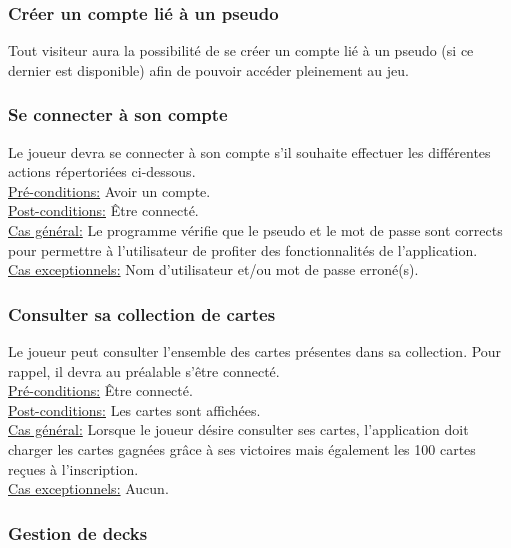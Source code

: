 \documentclass[11pt,a4paper]{article}
\begin{document}
\subsubsection*{Créer un compte lié à un pseudo}

Tout visiteur aura la possibilité de se créer un compte
lié à un \gls{pseudo} (si ce dernier est disponible) afin de pouvoir
accéder pleinement au jeu.


\subsubsection*{Se connecter à son compte}
Le joueur devra se connecter à son compte s'il souhaite effectuer
les différentes actions répertoriées ci-dessous.\\
\underline{Pré-conditions:} 
 Avoir un compte.\\
\underline{Post-conditions:} 
 Être connecté.\\
\underline{Cas général:} 
 Le programme vérifie que le pseudo et le mot de passe sont corrects pour permettre à l'utilisateur de profiter des fonctionnalités de l'application.\\
\underline{Cas exceptionnels:} 
 Nom d'utilisateur et/ou mot de passe erroné(s).\\

\subsubsection*{Consulter sa collection de cartes}

Le joueur peut consulter l'ensemble des cartes présentes dans sa
\gls{collection}. Pour rappel, il devra au préalable s'être connecté.\\
\underline{Pré-conditions:} 
 Être connecté.\\
\underline{Post-conditions:} 
 Les cartes sont affichées.\\
\underline{Cas général:} 
 Lorsque le joueur désire consulter ses cartes, l'application doit charger les cartes gagnées grâce à ses victoires mais également les 100 cartes reçues à l'inscription.\\
\underline{Cas exceptionnels:} 
 Aucun.\\

\subsubsection*{Gestion de decks}
\end{document}
